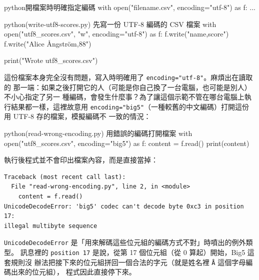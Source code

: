\begin{code}{python}{開檔案時明確指定編碼}
with open("filename.csv", encoding="utf-8") as f:
    ...
\end{code}

\begin{example}{python}{(write-utf8-scores.py) 先寫一份 UTF-8 編碼的 CSV 檔案}
with open("utf8_scores.csv", "w", encoding="utf-8") as f:
    f.write("name,score\n")
    f.write("Alice Ångström,88\n")

print("Wrote utf8_scores.csv")
\end{example}


這份檔案本身完全沒有問題，寫入時明確用了 \texttt{encoding="utf-8"}。麻煩出在讀取的
那一端：如果之後打開它的人（可能是你自己換了一台電腦，也可能是別人）不小心指定了另一
種編碼，會發生什麼事？為了讓這個示範不管在哪台電腦上執行結果都一樣，這裡故意用
\texttt{encoding="big5"}（一種較舊的中文編碼）打開這份用 UTF-8 存的檔案，模擬編碼不
一致的情況：

\begin{example}{python}{(read-wrong-encoding.py) 用錯誤的編碼打開檔案}
with open("utf8_scores.csv", encoding="big5") as f:
    content = f.read()
print(content)
\end{example}

執行後程式並不會印出檔案內容，而是直接當掉：

\begin{verbatim}
Traceback (most recent call last):
  File "read-wrong-encoding.py", line 2, in <module>
    content = f.read()
UnicodeDecodeError: 'big5' codec can't decode byte 0xc3 in position 17:
illegal multibyte sequence
\end{verbatim}

\texttt{UnicodeDecodeError} 是「用來解碼這些位元組的編碼方式不對」時噴出的例外類型。
訊息裡的 \texttt{position 17} 是說，從第 17 個位元組（從 0 算起）開始，Big5 這套規則沒
辦法把接下來的位元組拼回一個合法的字元（就是姓名裡 \texttt{Å} 這個字母編碼出來的位元組），
程式因此直接停下來。


